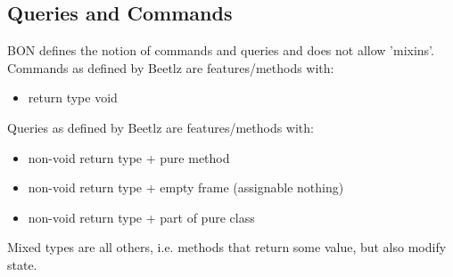 \documentclass[11pt]{amsart}
\begin{document}
\subsection{Queries and Commands}\label{queriescommands}\hfill \newline
BON defines the notion of commands and queries and does not allow 'mixins'. \\
Commands as defined by Beetlz are features/methods with:
\begin{itemize}
\item return type void
\end{itemize}
Queries as defined by Beetlz are features/methods with:
\begin{itemize}
\item non-void return type + pure method
\item non-void return type + empty frame (assignable nothing)
\item non-void return type + part of pure class
\end{itemize}
Mixed types are all others, i.e. methods that return some value, but also modify state.


\end{document}
